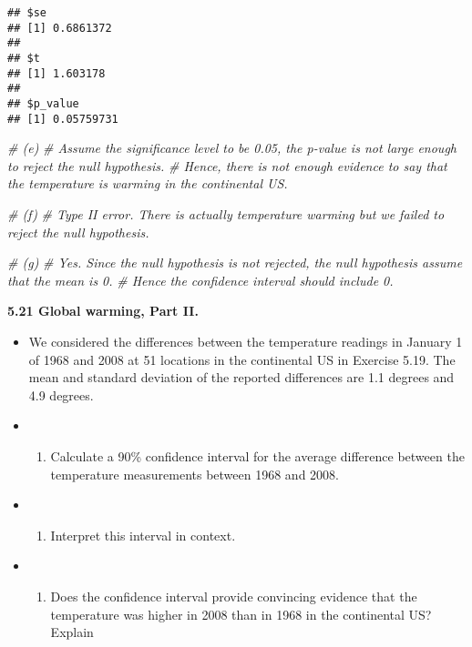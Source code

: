 \documentclass[]{book}
\newenvironment{Shaded}{\begin{snugshade}}{\end{snugshade}}
\newcommand{\CommentTok}[1]{\textcolor[rgb]{0.56,0.35,0.01}{\textit{#1}}}
\providecommand{\tightlist}{%
  \setlength{\itemsep}{0pt}\setlength{\parskip}{0pt}}
\begin{document}
\begin{verbatim}
## $se
## [1] 0.6861372
## 
## $t
## [1] 1.603178
## 
## $p_value
## [1] 0.05759731
\end{verbatim}

\begin{Shaded}
\begin{Highlighting}[]
\CommentTok{# (e)}
\CommentTok{# Assume the significance level to be 0.05, the p-value is not large enough to reject the null hypothesis.}
\CommentTok{# Hence, there is not enough evidence to say that the temperature is warming in the continental US.}
\end{Highlighting}
\end{Shaded}

\begin{Shaded}
\begin{Highlighting}[]
\CommentTok{# (f)}
\CommentTok{# Type II error. There is actually temperature warming but we failed to reject the null hypothesis.}
\end{Highlighting}
\end{Shaded}

\begin{Shaded}
\begin{Highlighting}[]
\CommentTok{# (g)}
\CommentTok{# Yes. Since the null hypothesis is not rejected, the null hypothesis assume that the mean is 0. }
\CommentTok{# Hence the confidence interval should include 0.}
\end{Highlighting}
\end{Shaded}

\textbf{5.21 Global warming, Part II.}

\begin{itemize}
\item
  We considered the differences between the temperature readings in January 1 of 1968 and 2008 at 51 locations in the continental US in Exercise 5.19. The mean and standard deviation of the reported differences are 1.1 degrees and 4.9 degrees.
\item
  \begin{enumerate}
  \def\labelenumi{(\alph{enumi})}
  \tightlist
  \item
    Calculate a 90\% confidence interval for the average difference between the temperature measurements between 1968 and 2008.
  \end{enumerate}
\item
  \begin{enumerate}
  \def\labelenumi{(\alph{enumi})}
  \setcounter{enumi}{1}
  \tightlist
  \item
    Interpret this interval in context.
  \end{enumerate}
\item
  \begin{enumerate}
  \def\labelenumi{(\alph{enumi})}
  \setcounter{enumi}{2}
  \tightlist
  \item
    Does the confidence interval provide convincing evidence that the temperature was higher in 2008 than in 1968 in the continental US? Explain
  \end{enumerate}
\end{itemize}
\end{document}

